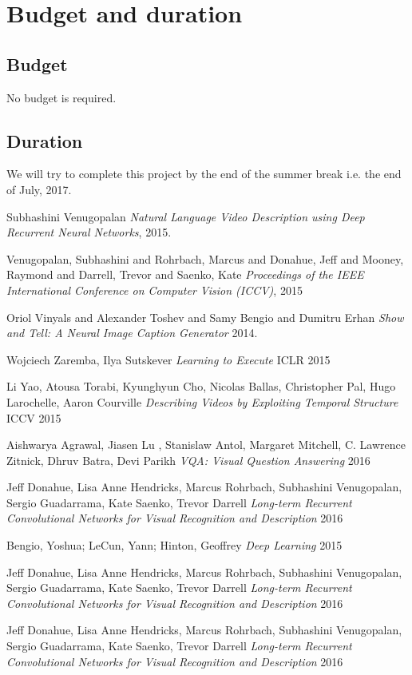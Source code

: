 \documentclass{article}
\begin{document}
	\section{Budget and duration}	
		\subsection{Budget}
			No budget is required.
					
		\subsection{Duration}
			We will try to complete this project by the end of the summer break i.e. the end of July, 2017. 

	\begin{thebibliography}{1}
	
	   Subhashini Venugopalan {\em Natural Language Video Description using Deep Recurrent Neural Networks}, 2015.
	
	    Venugopalan, Subhashini and Rohrbach, Marcus and Donahue, Jeff
                    and Mooney, Raymond and Darrell, Trevor and Saenko, Kate {\em Proceedings of the IEEE International Conference on Computer Vision (ICCV)}, 2015
	
	   Oriol Vinyals and
               Alexander Toshev and
               Samy Bengio and
               Dumitru Erhan {\em Show and Tell: {A} Neural Image Caption Generator} 2014.

         Wojciech Zaremba, Ilya Sutskever {\em Learning to Execute} ICLR 2015
         

           Li Yao, Atousa Torabi, Kyunghyun Cho, Nicolas Ballas, Christopher Pal, Hugo Larochelle, Aaron Courville {\em Describing Videos by Exploiting Temporal Structure} ICCV 2015
        

          Aishwarya Agrawal, Jiasen Lu , Stanislaw Antol,
		Margaret Mitchell, C. Lawrence Zitnick, Dhruv Batra, Devi Parikh {\em VQA: Visual Question Answering} 2016
        

          Jeff Donahue, Lisa Anne Hendricks, Marcus Rohrbach, Subhashini Venugopalan, Sergio Guadarrama, Kate Saenko, Trevor Darrell {\em Long-term Recurrent Convolutional Networks for Visual Recognition and Description} 2016

          Bengio, Yoshua; LeCun, Yann; Hinton, Geoffrey {\em Deep Learning} 2015

          Jeff Donahue, Lisa Anne Hendricks, Marcus Rohrbach, Subhashini Venugopalan, Sergio Guadarrama, Kate Saenko, Trevor Darrell {\em Long-term Recurrent Convolutional Networks for Visual Recognition and Description} 2016

          Jeff Donahue, Lisa Anne Hendricks, Marcus Rohrbach, Subhashini Venugopalan, Sergio Guadarrama, Kate Saenko, Trevor Darrell {\em Long-term Recurrent Convolutional Networks for Visual Recognition and Description} 2016
	\end{thebibliography}
\end{document}
